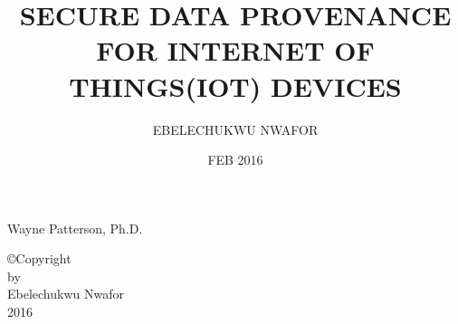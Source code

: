 \documentclass[12pt]{report}
\begin{document}

\setcounter{tocdepth}{2}


\title{SECURE DATA PROVENANCE FOR INTERNET OF THINGS(IOT) DEVICES}

\author{EBELECHUKWU NWAFOR}
\date{FEB 2016}

                 {Wayne Patterson, Ph.D.}
               
                 
				


\makesigpage

\begin{CenteredPage}
\copyright Copyright\\[0.2in]
by\\[0.2in]
Ebelechukwu Nwafor\\[0.2in]
2016
\end{CenteredPage}

\maketitlepage
\end{document}
